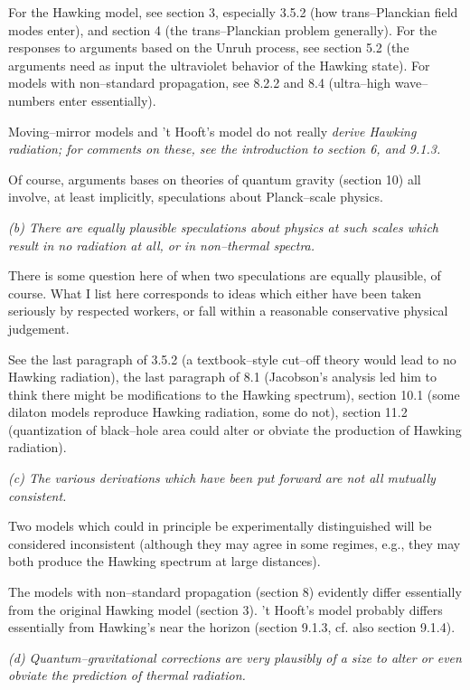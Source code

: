 For the Hawking model, see section 3, especially 3.5.2 (how trans--Planckian
field modes enter), and section 4 (the trans--Planckian problem generally).
For the responses to
arguments based on the Unruh process, see section 5.2 (the arguments
need as input the ultraviolet behavior of the Hawking state).  
For models with non--standard propagation, see 8.2.2 and 8.4
(ultra--high wave--numbers enter essentially).

Moving--mirror models and 't Hooft's model do not really \it derive \rm Hawking
radiation; for comments on these, see the introduction to section 6, and 9.1.3.

Of course, arguments bases on theories of quantum gravity (section 10)
all involve, at least implicitly, speculations about Planck--scale
physics.

\smallskip
\it (b) There are equally plausible speculations about physics at such
scales which result in no radiation at all, or in non--thermal
spectra.  \rm

There is some question here of when two speculations are equally
plausible, of course.  What I list here corresponds to ideas which
either have been taken seriously by respected workers, or fall within
a reasonable conservative physical judgement.

See the last paragraph of 3.5.2 (a textbook--style cut--off theory would
lead to no Hawking radiation), the last paragraph of 8.1 (Jacobson's analysis
led him to think there might be modifications to the Hawking spectrum), section
10.1 (some dilaton models reproduce Hawking radiation, some do not), 
section 11.2 (quantization of black--hole area could alter or obviate the
production of Hawking radiation).

\smallskip
\it (c) The various derivations which have been put forward are not all
mutually consistent.  \rm

Two models which could in principle be experimentally distinguished will be
considered inconsistent (although they may agree in some regimes, e.g., they may
both produce the Hawking spectrum at large distances).

The models with non--standard propagation (section 8) evidently differ
essentially from the original Hawking model (section 3).  't Hooft's
model probably differs essentially from Hawking's near the horizon
(section 9.1.3, cf. also section 9.1.4).

\smallskip
\it (d) Quantum--gravitational corrections are very plausibly of a
size to alter or even obviate the prediction of thermal radiation.
\rm

